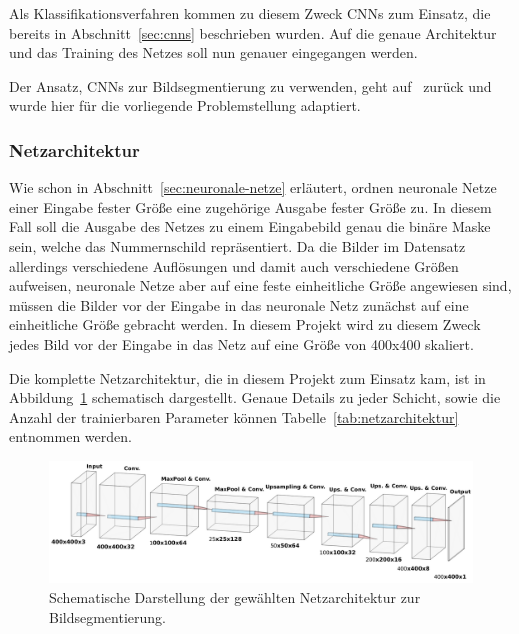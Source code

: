 Als Klassifikationsverfahren kommen zu diesem Zweck CNNs zum Einsatz,
die bereits in Abschnitt~\ref{sec:cnns} beschrieben wurden.
Auf die genaue Architektur und das Training des Netzes soll nun genauer
eingegangen werden.

Der Ansatz, CNNs zur Bildsegmentierung zu verwenden, geht
auf~\cite{image-segmentation} zur\"uck und wurde hier f\"ur die
vorliegende Problemstellung adaptiert.

\subsubsection{Netzarchitektur}

Wie schon in Abschnitt~\ref{sec:neuronale-netze} erl\"autert, ordnen
neuronale Netze einer Eingabe fester Gr\"o{\ss}e eine zugeh\"orige
Ausgabe fester Gr\"o{\ss}e zu.
In diesem Fall soll die Ausgabe des Netzes zu einem Eingabebild
genau die bin\"are Maske sein, welche das Nummernschild repr\"asentiert.
Da die Bilder im Datensatz allerdings verschiedene Aufl\"osungen
und damit auch verschiedene Gr\"o{\ss}en aufweisen, neuronale Netze
aber auf eine feste einheitliche Gr\"o{\ss}e angewiesen sind,
m\"ussen die Bilder vor der Eingabe in das neuronale Netz
zun\"achst auf eine einheitliche Gr\"o{\ss}e gebracht werden.
In diesem Projekt wird zu diesem Zweck jedes Bild vor der Eingabe
in das Netz auf eine Gr\"o{\ss}e von 400x400 skaliert.

Die komplette Netzarchitektur, die in diesem Projekt zum Einsatz kam,
ist in Abbildung~\ref{fig:netzarchitektur} schematisch dargestellt.
Genaue Details zu jeder Schicht, sowie die Anzahl der trainierbaren
Parameter k\"onnen Tabelle~\ref{tab:netzarchitektur} entnommen werden.

\begin{figure}
    \centering
    \includegraphics[width=\textwidth]{abbildungen/network_architecture}
    \caption[Netzarchitektur]{Schematische Darstellung der gew\"ahlten Netzarchitektur
        zur Bildsegmentierung.}
    \label{fig:netzarchitektur}
\end{figure}

